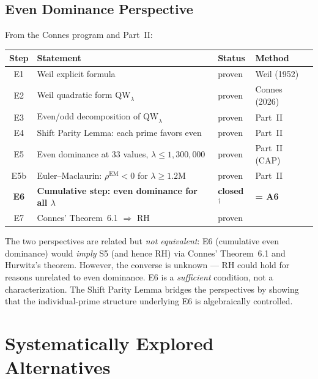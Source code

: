 \documentclass[12pt,a4paper]{article}
\theoremstyle{definition}
\theoremstyle{remark}
\begin{document}
\subsection{Even Dominance Perspective}

From the Connes program and Part~II:

\begin{center}
\renewcommand{\arraystretch}{1.2}
\begin{tabular}{c|l|l|l}
\textbf{Step} & \textbf{Statement} & \textbf{Status} & \textbf{Method} \\\hline
E1 & Weil explicit formula & proven & Weil (1952) \\
E2 & Weil quadratic form $\mathrm{QW}_\lambda$ & proven & Connes (2026) \\
E3 & Even/odd decomposition of $\mathrm{QW}_\lambda$ & proven & Part~II \\
E4 & Shift Parity Lemma: each prime favors even & proven & Part~II \\
E5 & Even dominance at $33$ values, $\lambda \leq 1{,}300{,}000$ & proven & Part~II (CAP) \\
E5b & Euler--Maclaurin: $\rho^{\mathrm{EM}} < 0$ for $\lambda \geq 1.2\mathrm{M}$ & proven & Part~II \\
\textbf{E6} & \textbf{Cumulative step: even dominance for all $\lambda$} & \textbf{closed${}^\dagger$} & \textbf{= A6} \\
E7 & Connes' Theorem~6.1 $\Rightarrow$ RH & proven & \cite{Connes2025}
\end{tabular}
\end{center}

\noindent The two perspectives are related but \emph{not equivalent}: E6 (cumulative even dominance) would \emph{imply} S5 (and hence RH) via Connes' Theorem~6.1 and Hurwitz's theorem. However, the converse is unknown --- RH could hold for reasons unrelated to even dominance. E6 is a \emph{sufficient} condition, not a characterization. The Shift Parity Lemma bridges the perspectives by showing that the individual-prime structure underlying E6 is algebraically controlled.


\needspace{8cm}
\section{Systematically Explored Alternatives}
\label{sec:explored-alternatives}
\end{document}
